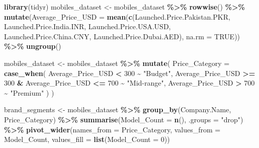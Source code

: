 \documentclass[
]{article}
\newenvironment{Shaded}{\begin{snugshade}}{\end{snugshade}}
\newcommand{\AttributeTok}[1]{\textcolor[rgb]{0.13,0.29,0.53}{#1}}
\newcommand{\ConstantTok}[1]{\textcolor[rgb]{0.56,0.35,0.01}{#1}}
\newcommand{\DecValTok}[1]{\textcolor[rgb]{0.00,0.00,0.81}{#1}}
\newcommand{\FunctionTok}[1]{\textcolor[rgb]{0.13,0.29,0.53}{\textbf{#1}}}
\newcommand{\NormalTok}[1]{#1}
\newcommand{\OtherTok}[1]{\textcolor[rgb]{0.56,0.35,0.01}{#1}}
\newcommand{\SpecialCharTok}[1]{\textcolor[rgb]{0.81,0.36,0.00}{\textbf{#1}}}
\newcommand{\StringTok}[1]{\textcolor[rgb]{0.31,0.60,0.02}{#1}}
\begin{document}
\begin{Shaded}
\begin{Highlighting}[]
\FunctionTok{library}\NormalTok{(tidyr)}
\NormalTok{mobiles\_dataset }\OtherTok{\textless{}{-}}\NormalTok{ mobiles\_dataset }\SpecialCharTok{\%\textgreater{}\%}
  \FunctionTok{rowwise}\NormalTok{() }\SpecialCharTok{\%\textgreater{}\%}
  \FunctionTok{mutate}\NormalTok{(}\AttributeTok{Average\_Price\_USD =} \FunctionTok{mean}\NormalTok{(}\FunctionTok{c}\NormalTok{(Launched.Price.Pakistan.PKR, Launched.Price.India.INR, }
\NormalTok{                                    Launched.Price.USA.USD, Launched.Price.China.CNY, }
\NormalTok{                                    Launched.Price.Dubai.AED), }\AttributeTok{na.rm =} \ConstantTok{TRUE}\NormalTok{)) }\SpecialCharTok{\%\textgreater{}\%}
  \FunctionTok{ungroup}\NormalTok{()}

\NormalTok{mobiles\_dataset }\OtherTok{\textless{}{-}}\NormalTok{ mobiles\_dataset }\SpecialCharTok{\%\textgreater{}\%}
  \FunctionTok{mutate}\NormalTok{(}
    \AttributeTok{Price\_Category =} \FunctionTok{case\_when}\NormalTok{(}
\NormalTok{      Average\_Price\_USD }\SpecialCharTok{\textless{}} \DecValTok{300} \SpecialCharTok{\textasciitilde{}} \StringTok{"Budget"}\NormalTok{,}
\NormalTok{      Average\_Price\_USD }\SpecialCharTok{\textgreater{}=} \DecValTok{300} \SpecialCharTok{\&}\NormalTok{ Average\_Price\_USD }\SpecialCharTok{\textless{}=} \DecValTok{700} \SpecialCharTok{\textasciitilde{}} \StringTok{"Mid{-}range"}\NormalTok{,}
\NormalTok{      Average\_Price\_USD }\SpecialCharTok{\textgreater{}} \DecValTok{700} \SpecialCharTok{\textasciitilde{}} \StringTok{"Premium"}
\NormalTok{    )}
\NormalTok{  )}

\NormalTok{brand\_segments }\OtherTok{\textless{}{-}}\NormalTok{ mobiles\_dataset }\SpecialCharTok{\%\textgreater{}\%}
  \FunctionTok{group\_by}\NormalTok{(Company.Name, Price\_Category) }\SpecialCharTok{\%\textgreater{}\%}
  \FunctionTok{summarise}\NormalTok{(}\AttributeTok{Model\_Count =} \FunctionTok{n}\NormalTok{(), }\AttributeTok{.groups =} \StringTok{"drop"}\NormalTok{) }\SpecialCharTok{\%\textgreater{}\%}
  \FunctionTok{pivot\_wider}\NormalTok{(}\AttributeTok{names\_from =}\NormalTok{ Price\_Category, }\AttributeTok{values\_from =}\NormalTok{ Model\_Count, }\AttributeTok{values\_fill =} \FunctionTok{list}\NormalTok{(}\AttributeTok{Model\_Count =} \DecValTok{0}\NormalTok{))}


\end{Highlighting}
\end{Shaded}
\end{document}
